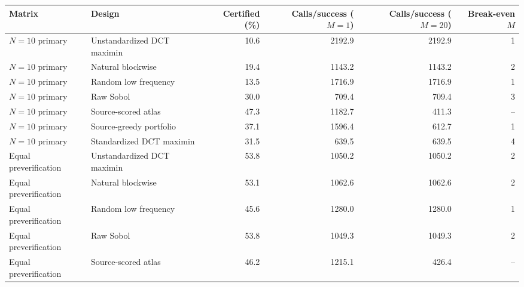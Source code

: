\begin{tabular}{llrrrr}
\toprule
Matrix & Design & Certified (\%) & Calls/success ($M=1$) & Calls/success ($M=20$) & Break-even $M$ \\
\midrule
$N=10$ primary & Unstandardized DCT maximin & 10.6 & 2192.9 & 2192.9 & 1 \\
$N=10$ primary & Natural blockwise & 19.4 & 1143.2 & 1143.2 & 2 \\
$N=10$ primary & Random low frequency & 13.5 & 1716.9 & 1716.9 & 1 \\
$N=10$ primary & Raw Sobol & 30.0 & 709.4 & 709.4 & 3 \\
$N=10$ primary & Source-scored atlas & 47.3 & 1182.7 & 411.3 & -- \\
$N=10$ primary & Source-greedy portfolio & 37.1 & 1596.4 & 612.7 & 1 \\
$N=10$ primary & Standardized DCT maximin & 31.5 & 639.5 & 639.5 & 4 \\
\addlinespace
Equal preverification & Unstandardized DCT maximin & 53.8 & 1050.2 & 1050.2 & 2 \\
Equal preverification & Natural blockwise & 53.1 & 1062.6 & 1062.6 & 2 \\
Equal preverification & Random low frequency & 45.6 & 1280.0 & 1280.0 & 1 \\
Equal preverification & Raw Sobol & 53.8 & 1049.3 & 1049.3 & 2 \\
Equal preverification & Source-scored atlas & 46.2 & 1215.1 & 426.4 & -- \\
\bottomrule
\end{tabular}
